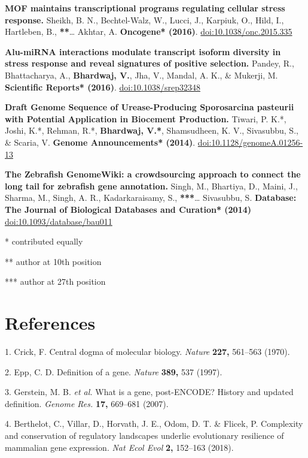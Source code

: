 \documentclass[11pt,twoside]{MPIthesis}
\theoremstyle{definition}
\theoremstyle{definition}
\theoremstyle{definition}
\theoremstyle{remark}
\begin{document}
\textbf{MOF maintains transcriptional programs regulating cellular
stress response.} Sheikh, B. N., Bechtel-Walz, W., Lucci, J., Karpiuk,
O., Hild, I., Hartleben, B., \textbf{**}\ldots{} Akhtar, A.
\textbf{Oncogene* (2016)}.
\href{https://doi.org/10.1038/onc.2015.335}{{doi:10.1038/onc.2015.335}}

\textbf{Alu-miRNA interactions modulate transcript isoform diversity in
stress response and reveal signatures of positive selection.} Pandey,
R., Bhattacharya, A., \textbf{Bhardwaj, V.}, Jha, V., Mandal, A. K., \&
Mukerji, M. \textbf{Scientific Reports* (2016)}.
\href{http://dx.doi.org/10.1038/srep32348}{{doi:10.1038/srep32348}}

\textbf{Draft Genome Sequence of Urease-Producing Sporosarcina pasteurii
with Potential Application in Biocement Production.} Tiwari, P. K.*,
Joshi, K.*, Rehman, R.*, \textbf{Bhardwaj, V.*}, Shamsudheen, K. V.,
Sivasubbu, S., \& Scaria, V. \textbf{Genome Announcements* (2014)}.
\href{https://doi.org/10.1128/genomeA.01256-13}{{doi:10.1128/genomeA.01256-13}}

\textbf{The Zebrafish GenomeWiki: a crowdsourcing approach to connect
the long tail for zebrafish gene annotation.} Singh, M., Bhartiya, D.,
Maini, J., Sharma, M., Singh, A. R., Kadarkaraisamy, S.,
\textbf{***}\ldots{} Sivasubbu, S. \textbf{Database: The Journal of
Biological Databases and Curation* (2014)}
\href{https://doi.org/10.1093/database/bau011}{{doi:10.1093/database/bau011}}

* contributed equally

** author at 10th position

*** author at 27th position

\backmatter

\chapter*{References}\label{references}

\noindent

1. Crick, F. Central dogma of molecular biology. \emph{Nature}
\textbf{227,} 561--563 (1970).

2. Epp, C. D. Definition of a gene. \emph{Nature} \textbf{389,} 537
(1997).

3. Gerstein, M. B. \emph{et al.} What is a gene, post-ENCODE? History
and updated definition. \emph{Genome Res.} \textbf{17,} 669--681 (2007).

4. Berthelot, C., Villar, D., Horvath, J. E., Odom, D. T. \& Flicek, P.
Complexity and conservation of regulatory landscapes underlie
evolutionary resilience of mammalian gene expression. \emph{Nat Ecol
Evol} \textbf{2,} 152--163 (2018).
\end{document}
